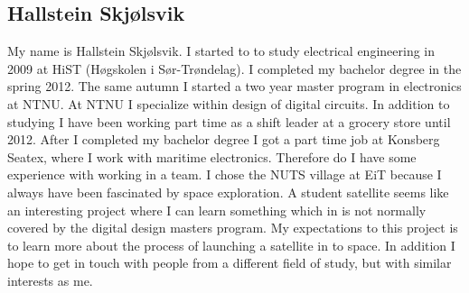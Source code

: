\subsection{Hallstein Skjølsvik}
My name is Hallstein Skjølsvik. I started to to study electrical engineering in 2009 at HiST (Høgskolen i Sør-Trøndelag). I completed my bachelor degree in the spring 2012. The same autumn I started a two year master program in electronics at NTNU. At NTNU I specialize within design of digital circuits. In addition to studying I have been working part time as a shift leader at a grocery store until 2012. After I completed my bachelor degree I got a part time job at Konsberg Seatex, where I work with maritime electronics. Therefore do I have some experience with working in a team. 
	I chose the NUTS village at EiT because I always have been fascinated by space exploration. A student satellite seems like an interesting project where I can learn something which in is not normally covered by the digital design masters program. My expectations to this project is to learn more about the process of launching a satellite in to space. In addition I hope to get in touch with people from a different field of study, but with similar interests as me.